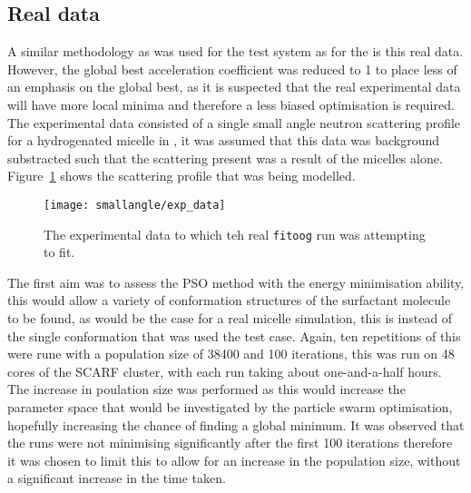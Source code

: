 \subsection{Real data}
A similar methodology as was used for the test system as for the is this real data.
However, the global best acceleration coefficient was reduced to 1 to place less of an emphasis on the global best, as it is suspected that the real experimental data will have more local minima and therefore a less biased optimisation is required.
The experimental data consisted of a single small angle neutron scattering profile for a hydrogenated  micelle in , it was assumed that this data was background substracted such that the scattering present was a result of the micelles alone.
Figure~\ref{fig:expdata} shows the scattering profile that was being modelled.
%
\begin{figure}
    \centering
    \texttt{[image: smallangle/exp\_data]}
    \caption{The experimental data to which teh real \texttt{fitoog} run was attempting to fit.}
    \label{fig:expdata}
\end{figure}
%

The first aim was to assess the PSO method with the energy minimisation ability, this would allow a variety of conformation structures of the surfactant molecule to be found, as would be the case for a real micelle simulation, this is instead of the single conformation that was used the test case.
Again, ten repetitions of this were rune with a population size of 38400 and 100 iterations, this was run on 48 cores of the SCARF cluster, with each run taking about one-and-a-half hours.
The increase in poulation size was performed as this would increase the parameter space that would be investigated by the particle swarm optimisation, hopefully increasing the chance of finding a global minimum.
It was observed that the runs were not minimising significantly after the first 100 iterations therefore it was chosen to limit this to allow for an increase in the population size, without a significant increase in the time taken.
